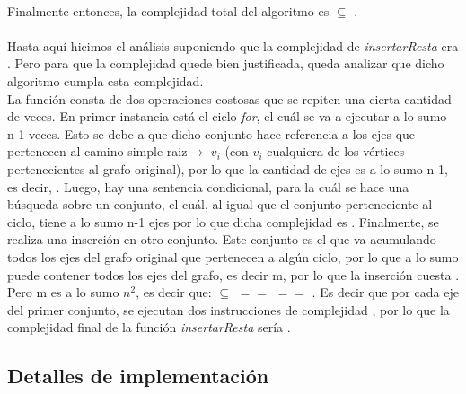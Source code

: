 \paragraph{}
Finalmente entonces, la complejidad total del algoritmo es  $\subseteq$ .

\paragraph{}
Hasta aquí hicimos el análisis suponiendo que la complejidad de \textit{insertarResta} era . Pero para que la complejidad quede bien justificada, queda analizar que dicho algoritmo cumpla esta complejidad.\\
La función consta de dos operaciones costosas que se repiten una cierta cantidad de veces. En primer instancia está el ciclo \textit{for}, el cuál se va a ejecutar a lo sumo n-1 veces. Esto se debe a que dicho conjunto hace referencia a los ejes que pertenecen al camino simple raiz$\rightarrow$ $v_i$ (con $v_i$ cualquiera de los vértices pertenecientes al grafo original), por lo que la cantidad de ejes es a lo sumo n-1, es decir, . Luego, hay una sentencia condicional, para la cuál se hace una búsqueda sobre un conjunto, el cuál, al igual que el conjunto perteneciente al ciclo, tiene a lo sumo n-1 ejes por lo que dicha complejidad es . Finalmente, se realiza una inserción en otro conjunto. Este conjunto es el que va acumulando todos los ejes del grafo original que pertenecen a algún ciclo, por lo que a lo sumo puede contener todos los ejes del grafo, es decir m, por lo que la inserción cuesta . Pero m es a lo sumo $n^2$, es decir que:  $\subseteq$  $==$  $==$ . Es decir que por cada eje del primer conjunto, se ejecutan dos instrucciones de complejidad , por lo que la complejidad final de la función \textit{insertarResta} sería .


\subsection{Detalles de implementación}
\label{imp2}

